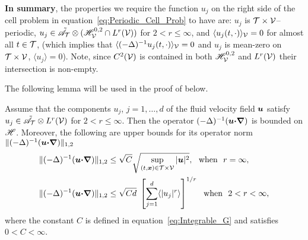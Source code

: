 \documentclass[amsa]{ipart}
\begin{document}
    

\textbf{In summary}, the properties we require the function $u_j$ on
the right side of the cell problem in
equation~\eqref{eq:Periodic_Cell_Prob} to have are: 
$u_j$ is $\mathcal{T}\times\mathcal{V}$--periodic, $u_j\in\tilde{\mathscr{A}}_{\mathcal{T}}\otimes(\mathscr{H}^{0,2}_{\mathcal{V}}\cap
L^r(\mathcal{V}))$ for $2<r\leq\infty$, and $\langle u_j(t,\cdot)\rangle_{\mathcal{V}}=0$ for almost all
$t\in\mathcal{T}$, (which implies that $\langle(-\Delta)^{-1}u_j(t,\cdot)\rangle_{\mathcal{V}}=0$ and $u_j$ is
mean-zero on $\mathcal{T}\times\mathcal{V}$, $\langle u_j\rangle=0$). Note, since $C^2(\mathcal{V})$ is
contained in both $\mathscr{H}^{0,2}_{\mathcal{V}}$ and $L^r(\mathcal{V})$ their intersection
is non-empty.       






The following lemma will be used in the
proof of  below.
%
\begin{lemma}\label{lem:A_bounded}
%
Assume that the components $u_j$, $j=1,\ldots,d$ of the fluid velocity
field $\boldsymbol{u}$ satisfy $u_j\in\tilde{\mathscr{A}}_{\mathcal{T}}\otimes L^r(\mathcal{V})$ for
$2<r\leq\infty$. Then the operator $(-\Delta)^{-1}(\boldsymbol{u}\mbox{\boldmath${\cdot}$}\mbox{\boldmath${\nabla}$})$ is bounded
on $\mathscr{H}$. Moreover, the following are upper bounds for its operator
norm $\|(-\Delta)^{-1}(\boldsymbol{u}\mbox{\boldmath${\cdot}$}\mbox{\boldmath${\nabla}$})\|_{1,2}$ 
%
\begin{align}
  \|(-\Delta)^{-1}(\vecu\bcdot\bnabla)\|_{1,2}
  &\leq\sqrt{C}\sqrt{\sup_{(t,\vecx)\in\Tc\times\Vc}|\vecu|^2},
  ~\text{ when }~ r=\infty,
  \label{eq:Bound_A1}  
  \\
  \|(-\Delta)^{-1}(\vecu\bcdot\bnabla)\|_{1,2}
  &\leq\sqrt{Cd}\;\left[\sum_{j=1}^d\langle|u_j|^r\rangle\right]^{1/r}
  ~\text{ when }~ 2<r<\infty,
  \label{eq:Bound_A2}
\end{align}
%
where the constant $C$ is defined in equation~\eqref{eq:Integrable_G}
and satisfies $0<C<\infty$. 
%
\end{lemma}
%
\end{document}
